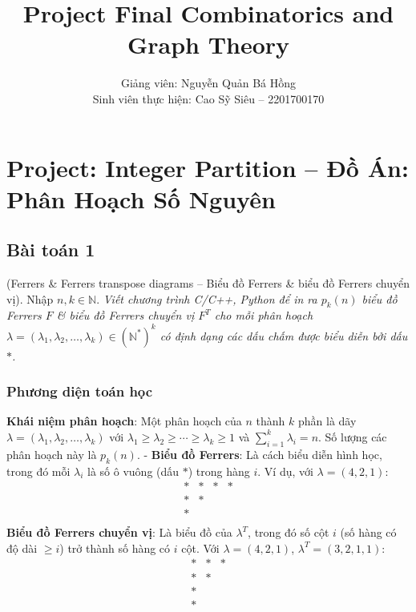 \documentclass[a4paper,12pt]{article}
\title{Project Final Combinatorics and Graph Theory}
\author{Giảng viên: Nguyễn Quản Bá Hồng \\ Sinh viên thực hiện: Cao Sỹ Siêu – 2201700170}
\date{}
\begin{document}
\maketitle


\newpage
\section{Project: Integer Partition – Đồ Án: Phân Hoạch Số Nguyên}
\subsection{Bài toán 1} (Ferrers \& Ferrers transpose diagrams – Biểu đồ Ferrers \& biểu đồ Ferrers chuyển vị). Nhập $n, k \in \mathbb{N}$. \textit{Viết chương trình C/C++, Python để in ra $p_k(n)$ biểu đồ \textit{Ferrers} $F$ \& biểu đồ \textit{Ferrers chuyển vị} $F^T$ cho mỗi phân hoạch $\lambda = (\lambda_1, \lambda_2, \ldots, \lambda_k) \in (\mathbb{N}^*)^k$ có định dạng các dấu chấm được biểu diễn bởi dấu $\ast$.}

\subsubsection{Phương diện toán học}
\textbf{Khái niệm phân hoạch}: Một phân hoạch của \( n \) thành \( k \) phần là dãy \( \lambda = (\lambda_1, \lambda_2, \ldots, \lambda_k) \) với \( \lambda_1 \geq \lambda_2 \geq \cdots \geq \lambda_k \geq 1 \) và \( \sum_{i=1}^k \lambda_i = n \). Số lượng các phân hoạch này là \( p_k(n) \).
- \textbf{Biểu đồ Ferrers}: Là cách biểu diễn hình học, trong đó mỗi \( \lambda_i \) là số ô vuông (dấu \( \ast \)) trong hàng \( i \). Ví dụ, với \( \lambda = (4, 2, 1) \):
  \[
  \begin{array}{cccc}
  \ast & \ast & \ast & \ast \\
  \ast & \ast & & \\
  \ast & & & \\
  \end{array}
  \]
 \textbf{Biểu đồ Ferrers chuyển vị}: Là biểu đồ của \( \lambda^T \), trong đó số cột \( i \) (số hàng có độ dài \( \geq i \)) trở thành số hàng có \( i \) cột. Với \( \lambda = (4, 2, 1) \), \( \lambda^T = (3, 2, 1, 1) \):
  \[
  \begin{array}{ccc}
  \ast & \ast & \ast \\
  \ast & \ast & \\
  \ast & & \\
  \ast & & \\
  \end{array}
  \]
\end{document}
